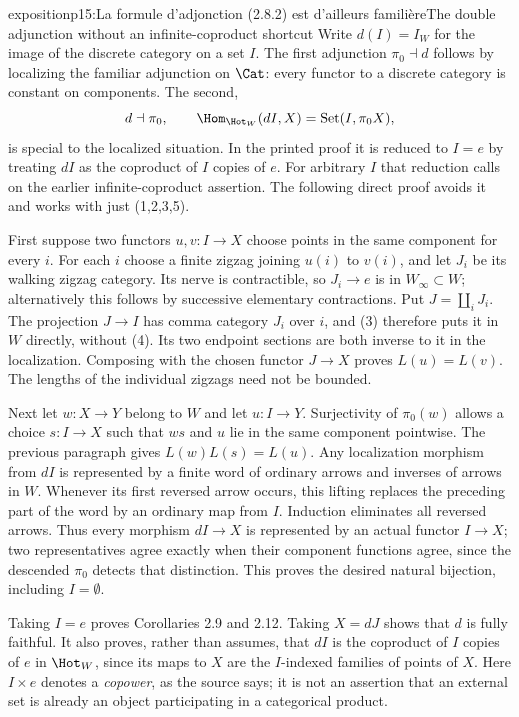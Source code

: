 \begin{dcomment}{exposition}{p15:La formule d'adjonction (2.8.2) est d'ailleurs familière}{The double adjunction without an infinite-coproduct shortcut}
Write $d(I)=I_W$ for the image of the discrete category on a set $I$. The first adjunction $\pi_0\dashv d$ follows by localizing the familiar adjunction on $\Cat$: every functor to a discrete category is constant on components. The second,
\[
d\dashv\pi_0,\qquad
\Hom_{\Hot_W}(dI,X)=\operatorname{Set}(I,\pi_0X),
\]
is special to the localized situation. In the printed proof it is reduced to $I=e$ by treating $dI$ as the coproduct of $I$ copies of $e$. For arbitrary $I$ that reduction calls on the earlier infinite-coproduct assertion. The following direct proof avoids it and works with just (1,2,3,5).

First suppose two functors $u,v:I\to X$ choose points in the same component for every $i$. For each $i$ choose a finite zigzag joining $u(i)$ to $v(i)$, and let $J_i$ be its walking zigzag category. Its nerve is contractible, so $J_i\to e$ is in $W_\infty\subset W$; alternatively this follows by successive elementary contractions. Put $J=\coprod_i J_i$. The projection $J\to I$ has comma category $J_i$ over $i$, and (3) therefore puts it in $W$ directly, without (4). Its two endpoint sections are both inverse to it in the localization. Composing with the chosen functor $J\to X$ proves $L(u)=L(v)$. The lengths of the individual zigzags need not be bounded.

Next let $w:X\to Y$ belong to $W$ and let $u:I\to Y$. Surjectivity of $\pi_0(w)$ allows a choice $s:I\to X$ such that $ws$ and $u$ lie in the same component pointwise. The previous paragraph gives $L(w)L(s)=L(u)$. Any localization morphism from $dI$ is represented by a finite word of ordinary arrows and inverses of arrows in $W$. Whenever its first reversed arrow occurs, this lifting replaces the preceding part of the word by an ordinary map from $I$. Induction eliminates all reversed arrows. Thus every morphism $dI\to X$ is represented by an actual functor $I\to X$; two representatives agree exactly when their component functions agree, since the descended $\pi_0$ detects that distinction. This proves the desired natural bijection, including $I=\emptyset$.

Taking $I=e$ proves Corollaries 2.9 and 2.12. Taking $X=dJ$ shows that $d$ is fully faithful. It also proves, rather than assumes, that $dI$ is the coproduct of $I$ copies of $e$ in $\Hot_W$, since its maps to $X$ are the $I$-indexed families of points of $X$. Here $I\times e$ denotes a \emph{copower}, as the source says; it is not an assertion that an external set is already an object participating in a categorical product.
\end{dcomment}

